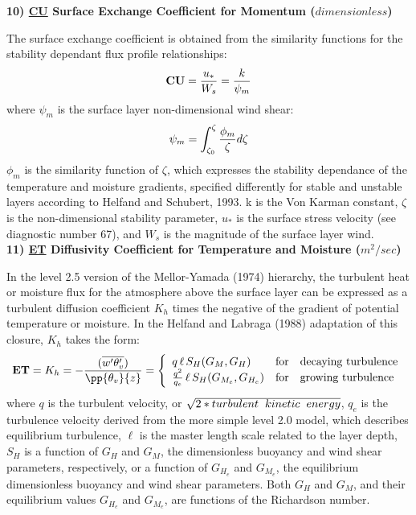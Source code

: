 \noindent
{\bf 10)  \underline {CU}  Surface Exchange Coefficient for Momentum ($dimensionless$) }

\noindent
The surface exchange coefficient is obtained from the similarity functions for the stability
 dependant flux profile relationships:
\[
{\bf CU} = {u_* \over W_s} = { k \over \psi_{m} } 
\]
where $\psi_m$ is the surface layer non-dimensional wind shear: 
\[
\psi_{m} = {\int_{\zeta_{0}}^{\zeta} {\phi_{m} \over \zeta} d \zeta}
\]
\noindent
$\phi_m$ is the similarity function of $\zeta$, which expresses the stability dependance of
the temperature and moisture gradients, specified differently for stable and unstable layers
according to Helfand and Schubert, 1993. k is the Von Karman constant, $\zeta$ is the 
non-dimensional stability parameter, $u_*$ is the surface stress velocity 
(see diagnostic number 67), and $W_s$ is the magnitude of the surface layer wind.
\\

\noindent
{\bf 11)  \underline {ET}  Diffusivity Coefficient for Temperature and Moisture ($m^2/sec$) }

\noindent
In the level 2.5 version of the Mellor-Yamada (1974) hierarchy, the turbulent heat or
moisture flux for the atmosphere above the surface layer can be expressed as a turbulent 
diffusion coefficient $K_h$ times the negative of the gradient of potential temperature 
or moisture. In the Helfand and Labraga (1988) adaptation of this closure, $K_h$ 
takes the form:
\[
{\bf ET} = K_h = -{( {\overline{w^{\prime}\theta_v^{\prime}}}) \over {\pp{\theta_v}{z}} }
 = \left\{ \begin{array}{l@{\quad\mbox{for}\quad}l} q \, \ell \, S_H(G_M,G_H) & \mbox{decaying turbulence}
\\ { q^2 \over {q_e} } \, \ell \, S_{H}(G_{M_e},G_{H_e}) & \mbox{growing turbulence} \end{array} \right.
\]
where $q$ is the turbulent velocity, or $\sqrt{2*turbulent \hspace{.2cm} kinetic \hspace{.2cm} 
energy}$, $q_e$ is the turbulence velocity derived from the more simple level 2.0 model, 
which describes equilibrium turbulence, $\ell$ is the master length scale related to the layer 
depth, 
$S_H$ is a function of $G_H$ and $G_M$, the dimensionless buoyancy and
wind shear parameters, respectively, or a function of $G_{H_e}$ and $G_{M_e}$, the equilibrium 
dimensionless buoyancy and wind shear
parameters.   Both $G_H$ and $G_M$, and their equilibrium values $G_{H_e}$ and $G_{M_e}$, 
are functions of the Richardson number.

